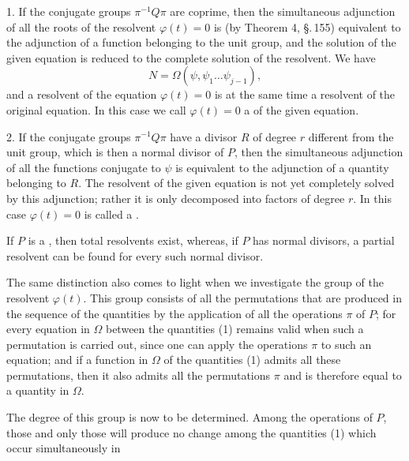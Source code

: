 
1. If the conjugate groups $\pi^{-1}Q\pi$ are coprime, then
the simultaneous adjunction of all the roots of the
resolvent $\varphi(t) = 0$ is (by Theorem 4, \S.\,155) equivalent to
the adjunction of a function belonging to the unit group,
and the solution of the given equation is reduced to the complete
solution of the resolvent. We have
\[ N = \Omega(\psi, \psi_1 \ldots \psi_{j-1}), \]
and a  resolvent of the equation $\varphi(t) = 0$ is
at the same time a  resolvent of the original equation.
In this case we call $\varphi(t) = 0$ a 
of the given equation.

2. If the conjugate groups $\pi^{-1}Q\pi$ have a divisor $R$
of degree $r$ different from the unit group, which is then
a normal divisor of $P$, then the simultaneous adjunction
of all the functions conjugate to $\psi$ is equivalent
to the adjunction of a quantity belonging to $R$. The 
resolvent of the given equation is not yet completely solved
by this adjunction; rather it is only decomposed into factors
of degree $r$. In this case $\varphi(t) = 0$ is called a
.

If $P$ is a , then  total resolvents
exist, whereas, if $P$ has normal divisors, a partial
resolvent can be found for every such normal
divisor.

The same distinction also comes to light when we investigate the
 group of the resolvent $\varphi(t)$. This
group consists of all the permutations that are produced in the sequence of the
quantities
by the application of all the operations $\pi$ of $P$; for every equation in $\Omega$ between the quantities (1)
remains valid when such a permutation is carried out,
since one can apply the operations $\pi$ to such an equation;
and if a function in $\Omega$ of the quantities (1) admits all these
permutations, then it also admits all the permutations $\pi$
and is therefore equal to a quantity in $\Omega$.

The degree of this group is now to be determined. Among
the operations of $P$, those and only those will produce no
change among the quantities (1) which occur simultaneously in

